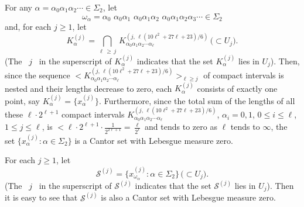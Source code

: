 \documentclass[12pt]{article}
\newcommand{\al}{\alpha}
\begin{document}
\indent For any $\al = \al_0\al_1\al_2 \cdots \in \Sigma_2$, let 
{\large 
$$
\omega_\al = \al_0 \,\, \al_0\al_1 \,\, \al_0\al_1\al_2 \,\, \al_0\al_1\al_2\al_3 \cdots \in \Sigma_2
$$} 
and, for each $j \ge 1$, let 
$$
K_\al^{(j)} = \bigcap_{\ell \, \ge \, j} \, K_{\al_0\al_1\al_2\cdots \al_\ell}^{(j, \, \ell(10\ell^2+27\ell+23)/6)} \, \big(\subset U_j\big).
$$ 
\big(The \, $j$ \, in the superscript of $K_\al^{(j)}$ indicates that the set $K_\al^{(j)}$ lies in $U_j$\big).  Then, since the sequence $< K_{\al_0\al_1\al_2\cdots \al_\ell}^{(j, \, \ell(10\ell^2+27\ell+23)/6)}>_{\ell \ge j}$ of compact intervals is nested and their lengths decrease to zero, each $K_\alpha^{(j)}$ consists of exactly one point, say $K_\al^{(j)} = \{ x_\al^{(j)} \}$.  Furthermore, since the total sum of the lengths of all these $\ell \cdot 2^{\ell+1}$ compact intervals $K_{\al_0\al_1\al_2\cdots \al_\ell}^{(j, \,\ell(10\ell^2+27\ell+23)/6)}$, $\al_i = 0, 1$, $0 \le i \le \ell$, $1 \le j \le \ell$, is $< \ell \cdot 2^{\ell+1} \cdot \frac 1{2^{2\ell+1}} = \frac \ell{2^\ell}$ and tends to zero as $\ell$ tends to $\infty$, the set $\{ x_\alpha^{(j)} : \alpha \in \Sigma_2 \}$ is a Cantor set with Lebesgue measure zero.

For each $j \ge 1$, let 
$$
\mathcal S^{(j)} = \{ x_{\omega_\al}^{(j)} : \al \in \Sigma_2 \} \, \big(\subset U_j\big).
$$
\big(The \, $j$ \, in the superscript of $\mathcal S^{(j)}$ indicates that the set $\mathcal S^{(j)}$ lies in $U_j$\big).  Then it is easy to see that $\mathcal S^{(j)}$ is also a Cantor set with Lebesgue measure zero.  
\end{document}
